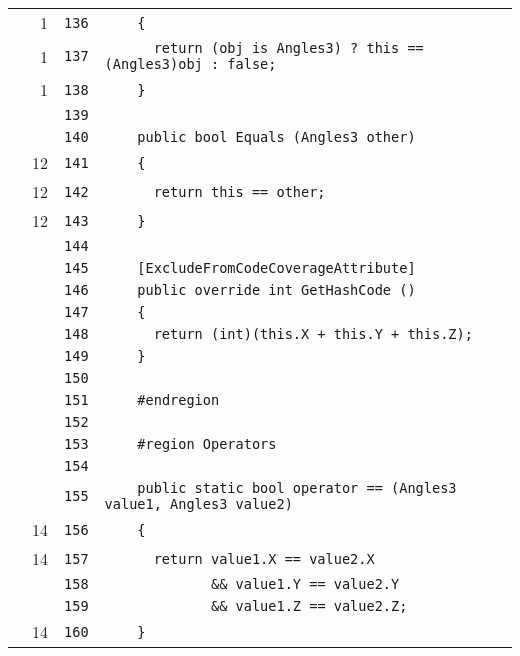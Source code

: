 \documentclass[a4paper,10pt]{article}
\begin{document}
\begin{longtable}[l]{lrrl}
\cellcolor{green} & 1 & \verb~136~ & \verb~    {~\\
\cellcolor{green} & 1 & \verb~137~ & \verb~      return (obj is Angles3) ? this == (Angles3)obj : false;~\\
\cellcolor{green} & 1 & \verb~138~ & \verb~    }~\\
\cellcolor{gray} &  & \verb~139~ & \verb~~\\
\cellcolor{gray} &  & \verb~140~ & \verb~    public bool Equals (Angles3 other)~\\
\cellcolor{green} & 12 & \verb~141~ & \verb~    {~\\
\cellcolor{green} & 12 & \verb~142~ & \verb~      return this == other;~\\
\cellcolor{green} & 12 & \verb~143~ & \verb~    }~\\
\cellcolor{gray} &  & \verb~144~ & \verb~~\\
\cellcolor{gray} &  & \verb~145~ & \verb~    [ExcludeFromCodeCoverageAttribute]~\\
\cellcolor{gray} &  & \verb~146~ & \verb~    public override int GetHashCode ()~\\
\cellcolor{gray} &  & \verb~147~ & \verb~    {~\\
\cellcolor{gray} &  & \verb~148~ & \verb~      return (int)(this.X + this.Y + this.Z);~\\
\cellcolor{gray} &  & \verb~149~ & \verb~    }~\\
\cellcolor{gray} &  & \verb~150~ & \verb~~\\
\cellcolor{gray} &  & \verb~151~ & \verb~    #endregion~\\
\cellcolor{gray} &  & \verb~152~ & \verb~~\\
\cellcolor{gray} &  & \verb~153~ & \verb~    #region Operators~\\
\cellcolor{gray} &  & \verb~154~ & \verb~~\\
\cellcolor{gray} &  & \verb~155~ & \verb~    public static bool operator == (Angles3 value1, Angles3 value2)~\\
\cellcolor{green} & 14 & \verb~156~ & \verb~    {~\\
\cellcolor{green} & 14 & \verb~157~ & \verb~      return value1.X == value2.X~\\
\cellcolor{gray} &  & \verb~158~ & \verb~             && value1.Y == value2.Y~\\
\cellcolor{gray} &  & \verb~159~ & \verb~             && value1.Z == value2.Z;~\\
\cellcolor{green} & 14 & \verb~160~ & \verb~    }~\\

\end{longtable}
\end{document}
